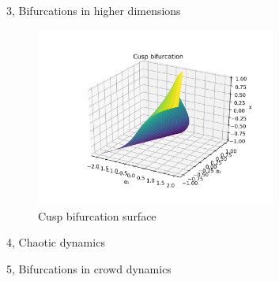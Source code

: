 \documentclass[10pt,a4paper]{article}
\begin{document}
\begin{task}{3, Bifurcations in higher dimensions}
\begin{figure}[H]
    \centering
    \includegraphics[width=0.7\textwidth]{../plots/Figure_0.png}
    \caption{Cusp bifurcation surface}
    \label{fig:task3_cusp}
\end{figure}
\end{task}
\begin{task}{4, Chaotic dynamics}
\end{task}
\begin{task}{5, Bifurcations in crowd dynamics}
\end{task}
\end{document}
